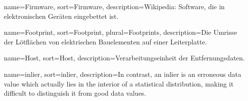 
{
	name={Firmware},
	sort={Firmware},
	description={Wikipedia: Software, die in elektronischen Geräten eingebettet ist.}
}

{
	name={Footprint}, sort={Footprint}, plural={Footprints},
	description={Die Umrisse der Lötflächen von elektrischen Bauelementen auf einer Leiterplatte.}
} %

{
	name={Host},
	sort={Host},
	description={Verarbeitungseinheit der Entfernungsdaten.}
}

{
	name={inlier}, sort={inlier},
	description={In contrast, an inlier is an erroneous data value which actually lies in the interior of a statistical distribution, making it difficult to distinguish it from good data values.}
} %


